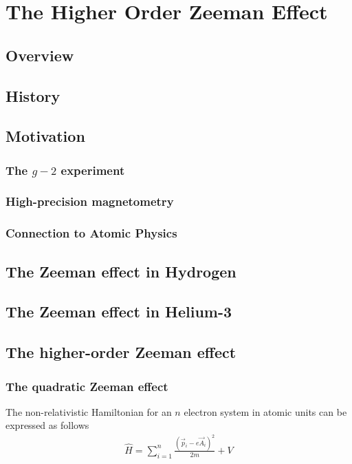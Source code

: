 \chapter{The Higher Order Zeeman Effect}\label{sec:Zeeman-Effect}
    \section{Overview}
    \section{History}
    \section{Motivation}
        \subsection{The $g-2$ experiment}
        \subsection{High-precision magnetometry}
        \subsection{Connection to Atomic Physics}
    \section{The Zeeman effect in Hydrogen}
    \section{The Zeeman effect in Helium-3}
    \section{The higher-order Zeeman effect}
        \subsection{The quadratic Zeeman effect}
            The non-relativistic Hamiltonian for an $n$ electron system in atomic units can be expressed as follows
            \begin{align}
                \hat{H} = \sum_{i = 1}^n \frac{\left(\vec{p}_i - e\vec{A}_i \right)^2}{2m} + V
            \end{align}

